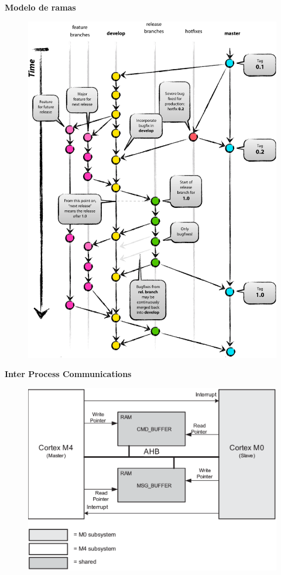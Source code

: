 \documentclass[11pt]{beamer}
\begin{document}
\begin{frame}{\textbf{\LARGE{Modelo de ramas}}}
	\vspace{-.7cm}
	\begin{figure}[H]
		\includegraphics[height=.8\textheight]{./imagenes/Git-branching-model.pdf}
	\end{figure}	
\end{frame}


\begin{frame}{\textbf{\LARGE{Inter Process Communications}}}
	\vspace{-.7cm}
	\begin{figure}[H]
		\includegraphics[height=.8\textheight]{./imagenes/IPC.png}
	\end{figure}	
\end{frame}
\end{document}
